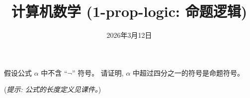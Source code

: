 \documentclass[a4paper, justified]{tufte-handout}
\title{计算机数学 (1-prop-logic: 命题逻辑)}
\date{2026年3月12日}
\begin{document}
\maketitle
\noplagiarism %
\begin{abstract}
\end{abstract}
\beginrequired
\newpage
\begin{problem}[命题逻辑公式上的数学归纳法]
  假设公式 $\alpha$ 中不含 ``$\lnot$'' 符号。
  请证明, $\alpha$ 中超过四分之一的符号是命题符号。

  ({\it 提示: 公式的长度定义见课件。})
\end{problem}
\end{document}
